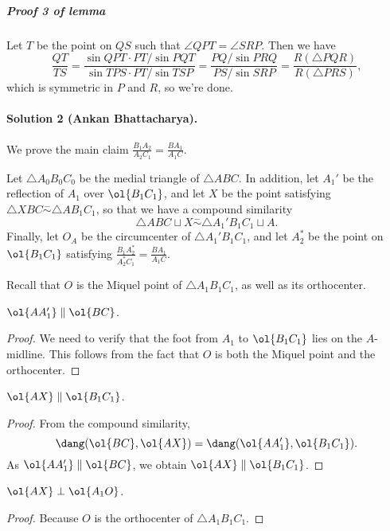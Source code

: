 \documentclass[11pt]{scrartcl}
\begin{document}
\subparagraph{Proof 3 of lemma}
  Let $T$ be the point on $QS$ such that $\angle QPT = \angle SRP$. Then we have
  \[
    \frac{QT}{TS} = \frac{\sin QPT \cdot PT / \sin PQT}{\sin TPS \cdot PT / \sin TSP} = \frac{PQ / \sin PRQ}{PS / \sin SRP} = \frac{R(\triangle PQR)}{R(\triangle PRS)},
  \]
  which is symmetric in $P$ and $R$, so we're done.

\paragraph{Solution 2 (Ankan Bhattacharya).}
We prove the main claim $\tfrac{B_1A_2}{A_2C_1} = \tfrac{BA_1}{A_1C}$.

Let $\triangle A_0B_0C_0$ be the medial triangle of $\triangle ABC$.
In addition, let $A_1'$ be the reflection of $A_1$ over $\ol{B_1C_1}$,
and let $X$ be the point satisfying $\triangle XBC \stackrel{-}{\sim} \triangle AB_1C_1$,
so that we have a compound similarity
\[ \triangle ABC \sqcup X
\stackrel{-}{\sim} \triangle A_1'B_1C_1 \sqcup A. \]
Finally, let $O_A$ be the circumcenter of $\triangle A_1'B_1C_1$,
and let $A_2^*$ be the point on $\ol{B_1C_1}$
satisfying $\tfrac{B_1A_2^*}{A_2^*C_1} = \tfrac{BA_1}{A_1C}$.

Recall that $O$ is the Miquel point of $\triangle A_1B_1C_1$,
as well as its orthocenter.
\begin{claim*}
  $\ol{AA_1'} \parallel \ol{BC}$.
\end{claim*}
\begin{proof}
  We need to verify that the foot from $A_1$ to $\ol{B_1C_1}$
  lies on the $A$-midline.
  This follows from the fact that $O$ is both the Miquel point
  and the orthocenter.
\end{proof}

\begin{claim*}
  $\ol{AX} \parallel \ol{B_1C_1}$.
\end{claim*}
\begin{proof}
  From the compound similarity,
  \[ \dang (\ol{BC}, \ol{AX})
  = \dang (\ol{AA_1'}, \ol{B_1C_1}). \]
  As $\ol{AA_1'} \parallel \ol{BC}$,
  we obtain $\ol{AX} \parallel \ol{B_1C_1}$.
\end{proof}

\begin{claim*}
  $\ol{AX} \perp \ol{A_1O}$.
\end{claim*}
\begin{proof}
  Because $O$ is the orthocenter of $\triangle A_1B_1C_1$.
\end{proof}
\end{document}
